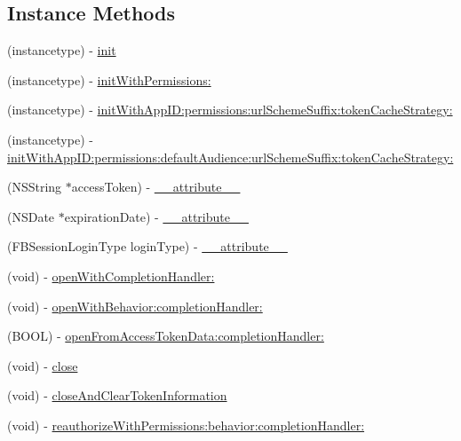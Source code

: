 \subsection*{Instance Methods}
\begin{DoxyCompactItemize}
\item 
(instancetype) -\/ \hyperlink{interfaceFBSession_ac5ec026f515c232cd4498cf2bc4022b4}{init}
\item 
(instancetype) -\/ \hyperlink{interfaceFBSession_a3f8419d590fb8f950aa9aee7110fb5e6}{init\+With\+Permissions\+:}
\item 
(instancetype) -\/ \hyperlink{interfaceFBSession_ae73ce3214852d1af28cbb02e7f733b37}{init\+With\+App\+I\+D\+:permissions\+:url\+Scheme\+Suffix\+:token\+Cache\+Strategy\+:}
\item 
(instancetype) -\/ \hyperlink{interfaceFBSession_a7f878c2e85b4f400378bf0c00314e7c3}{init\+With\+App\+I\+D\+:permissions\+:default\+Audience\+:url\+Scheme\+Suffix\+:token\+Cache\+Strategy\+:}
\item 
(N\+S\+String $\ast$access\+Token) -\/ \hyperlink{interfaceFBSession_a129a9e2b497ba201043bb82244156341}{\+\_\+\+\_\+attribute\+\_\+\+\_\+}
\item 
(N\+S\+Date $\ast$expiration\+Date) -\/ \hyperlink{interfaceFBSession_a42e6a02db4caa8197e8fc851bc18f1e1}{\+\_\+\+\_\+attribute\+\_\+\+\_\+}
\item 
(F\+B\+Session\+Login\+Type login\+Type) -\/ \hyperlink{interfaceFBSession_acd3c247502e2514d93ccf123ad4824f8}{\+\_\+\+\_\+attribute\+\_\+\+\_\+}
\item 
(void) -\/ \hyperlink{interfaceFBSession_a874152230789c87cd181d1f976e3715f}{open\+With\+Completion\+Handler\+:}
\item 
(void) -\/ \hyperlink{interfaceFBSession_add7058f99fde92c093a92acf192dcd0a}{open\+With\+Behavior\+:completion\+Handler\+:}
\item 
(B\+O\+OL) -\/ \hyperlink{interfaceFBSession_a669e34ba5599646255507299f7a60dac}{open\+From\+Access\+Token\+Data\+:completion\+Handler\+:}
\item 
(void) -\/ \hyperlink{interfaceFBSession_a91eccb960e90fc8cc6d24df1b2e94ce3}{close}
\item 
(void) -\/ \hyperlink{interfaceFBSession_ac4ad0564da77b3cecc0c67f762f5f1c7}{close\+And\+Clear\+Token\+Information}
\item 
(void) -\/ \hyperlink{interfaceFBSession_ac78d18a8fc82c995e326f2866ca9298f}{reauthorize\+With\+Permissions\+:behavior\+:completion\+Handler\+:}
\item 

\end{DoxyCompactItemize}
